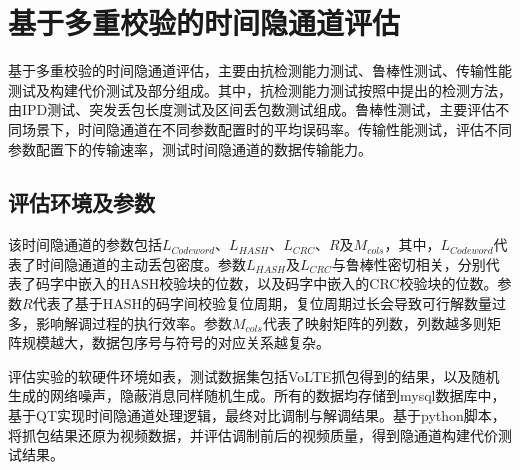 \section{基于多重校验的时间隐通道评估}
\label{chap:hash:result}

基于多重校验的时间隐通道评估，主要由抗检测能力测试、鲁棒性测试、传输性能测试及构建代价测试及部分组成。其中，抗检测能力测试按照中提出的检测方法，由IPD测试、突发丢包长度测试及区间丢包数测试组成。鲁棒性测试，主要评估不同场景下，时间隐通道在不同参数配置时的平均误码率。传输性能测试，评估不同参数配置下的传输速率，测试时间隐通道的数据传输能力。

\subsection{评估环境及参数}
\label{chap:hash:result:parameters}

该时间隐通道的参数包括$L_{Codeword}$、$L_{HASH}$、$L_{CRC}$、$R$及$M_{cols}$，其中，$L_{Codeword}$代表了时间隐通道的主动丢包密度。参数$L_{HASH}$及$L_{CRC}$与鲁棒性密切相关，分别代表了码字中嵌入的HASH校验块的位数，以及码字中嵌入的CRC校验块的位数。参数$R$代表了基于HASH的码字间校验复位周期，复位周期过长会导致可行解数量过多，影响解调过程的执行效率。参数$M_{cols}$代表了映射矩阵的列数，列数越多则矩阵规模越大，数据包序号与符号的对应关系越复杂。


评估实验的软硬件环境如表，测试数据集包括VoLTE抓包得到的结果，以及随机生成的网络噪声，隐蔽消息同样随机生成。所有的数据均存储到mysql数据库中，基于QT实现时间隐通道处理逻辑，最终对比调制与解调结果。基于python脚本，将抓包结果还原为视频数据，并评估调制前后的视频质量，得到隐通道构建代价测试结果。

